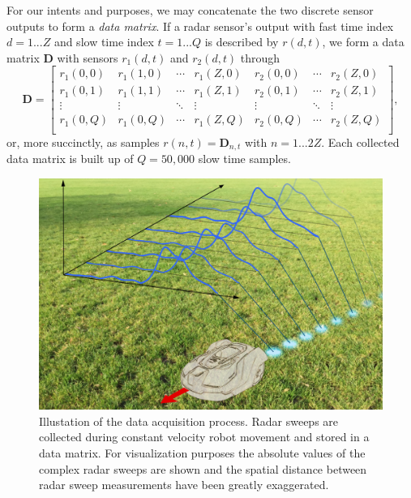 For our intents and purposes, we may concatenate the two discrete sensor outputs to form a \emph{data matrix}. If a radar sensor's output with fast time index $d=1...Z$ and slow time index $t=1...Q$ is described by $r(d,t)$, we form a data matrix $\mathbf{D}$ with sensors $r_1(d,t)$ and $r_2(d,t)$ through
\begin{equation}
	\mathbf{D}= 
	\begin{bmatrix}
		r_1(0,0) & r_1(1,0) & \cdots & r_1(Z,0) & r_2(0,0) & \cdots & r_2(Z,0) \\
		r_1(0,1) & r_1(1,1) & \cdots & r_1(Z,1) & r_2(0,1) & \cdots & r_2(Z,1) \\
		\vdots &  \vdots & \ddots & \vdots & \vdots & \ddots &  \vdots \\
		r_1(0,Q) & r_1(0,Q) & \cdots  & r_1(Z,Q) & r_2(0,Q) & \cdots  & r_2(Z,Q) \\
	\end{bmatrix}
	,
\end{equation}
or, more succinctly, as samples $r(n,t) = \mathbf{D}_{n,t}$ with $n=1...2Z$. Each collected data matrix is built up of $Q=50,000$ slow time samples.

\begin{figure}
	\centering
	\includegraphics[scale=0.60]{figs_temp/data_collecting.jpg}
	\caption{Illustation of the data acquisition process. Radar sweeps are collected during constant velocity robot movement and stored in a data matrix. For visualization purposes the absolute values of the complex radar sweeps are shown and the spatial distance between radar sweep measurements have been greatly exaggerated.}
	\label{fig:data_collecting}
\end{figure}

